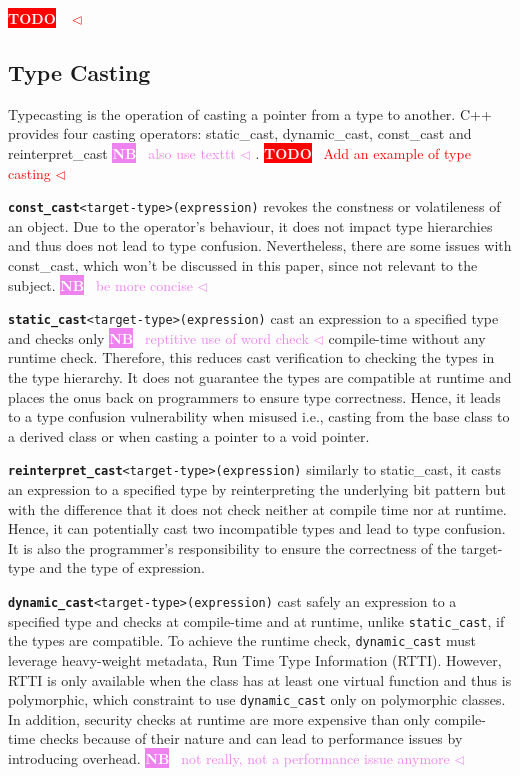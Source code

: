 \documentclass[a4paper,11pt,oneside]{report}
\newcommand{\todobox}[3]{%
       \colorbox{#1}{\textcolor{white}{\sffamily\bfseries\scriptsize #2}}%
       ~\textcolor{#1}{#3} %
       \textcolor{#1}{$\triangleleft$}%
}
\newcommand{\nb}[1]{\todobox{violet}{NB}{#1}}
\newcommand{\adrbqt}[1]{\todobox{red}{TODO}{#1}}
\begin{document}
\adrbqt{}
\subsection{Type Casting}
Typecasting is the operation of casting a pointer from a type to another. C++ provides four casting operators: static\_cast, dynamic\_cast, 
const\_cast and reinterpret\_cast \nb{also use texttt}.
\adrbqt{Add an example of type casting}

\texttt{\textbf{const\_cast}<target-type>(expression)} revokes the constness or volatileness of an object. Due to the operator's behaviour, it does not impact type hierarchies and 
thus does not lead to type confusion. Nevertheless, there are some issues with const\_cast, which won't be discussed in this paper, since not relevant to the subject. \nb{be more concise}

\texttt{\textbf{static\_cast}<target-type>(expression)} cast an expression to a specified type and checks only \nb{reptitive use of word check} compile-time without any runtime check. Therefore, this reduces cast verification to checking the types 
in the type hierarchy. It does not guarantee the types are compatible at runtime and places the onus back on programmers to ensure type correctness. Hence, it leads to a type confusion vulnerability when misused i.e.,
casting from the base class to a derived class or when casting a pointer to a void pointer.

\texttt{\textbf{reinterpret\_cast}<target-type>(expression)} similarly to static\_cast, it casts an expression to a specified type by reinterpreting the underlying bit pattern but with the difference 
that it does not check neither at compile time nor at runtime. Hence, it can potentially cast two incompatible types and lead to type confusion. 
It is also the programmer's responsibility to ensure the correctness of the target-type and the type of expression.

\texttt{\textbf{dynamic\_cast}<target-type>(expression)} cast safely an expression to a specified type and checks at compile-time and at runtime, unlike \texttt{static_cast}, if the types are compatible. 
To achieve the runtime check, \texttt{dynamic\_cast} must leverage heavy-weight metadata, Run Time Type Information (RTTI). However, RTTI is only available when the class has at least one virtual function 
and thus is polymorphic, which constraint to use \texttt{dynamic\_cast} only on polymorphic classes. In addition, security checks at runtime are more expensive than only compile-time checks because of their 
nature and can lead to performance issues by introducing overhead. \nb{not really, not a performance issue anymore}
\end{document}

